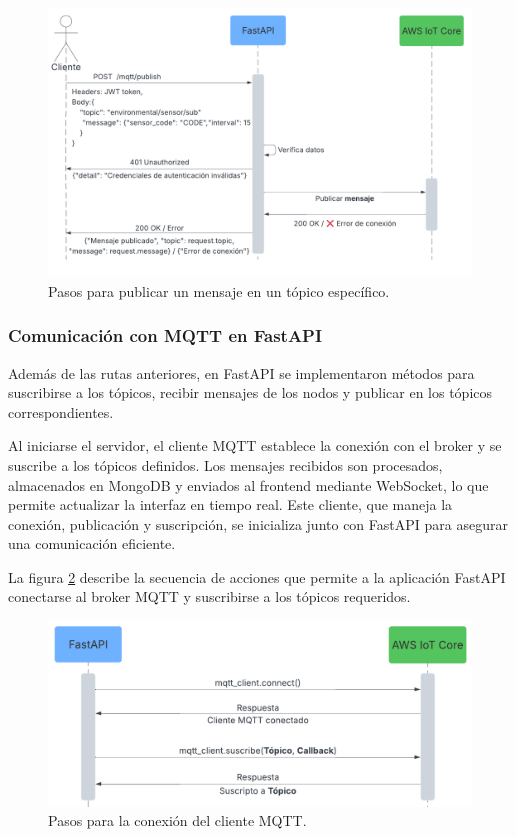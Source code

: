 \begin{figure}[H]
    \centering
    \includegraphics[width=.90\textwidth]{./Images/21.png}
    \caption{Pasos para publicar un mensaje en un tópico específico.}
    \label{fig:publish_mqtt}
\end{figure}

\subsubsection{Comunicación con MQTT en FastAPI}

Además de las rutas anteriores, en FastAPI se implementaron métodos para
suscribirse a los tópicos, recibir mensajes de los nodos y publicar en los
tópicos correspondientes.

Al iniciarse el servidor, el cliente MQTT establece la conexión con el broker y
se suscribe a los tópicos definidos. Los mensajes recibidos son procesados,
almacenados en MongoDB y enviados al frontend mediante WebSocket, lo que
permite actualizar la interfaz en tiempo real. Este cliente, que maneja la
conexión, publicación y suscripción, se inicializa junto con FastAPI para
asegurar una comunicación eficiente.

La figura \ref{fig:cliente_mqtt} describe la secuencia de acciones que permite
a la aplicación FastAPI conectarse al broker MQTT y suscribirse a los tópicos
requeridos.

\begin{figure}[H]
    \centering
    \includegraphics[width=.75\textwidth]{./Images/22.png}
    \caption{Pasos para la conexión del cliente MQTT.}
    \label{fig:cliente_mqtt}
\end{figure}

